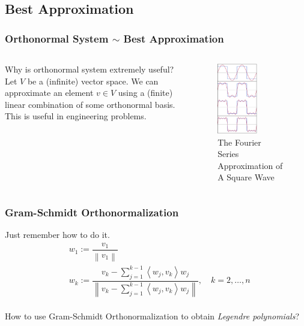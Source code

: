 \documentclass[12pt, t]{beamer}
\newcommand{\nullspace}{~\\[15pt]}
\begin{document}
\subsection{Best Approximation}
\begin{frame}
    \frametitle{Orthonormal System $\sim$ Best Approximation}
    \begin{columns}
        Why is orthonormal system extremely useful?
        \nullspace
        Let $V$ be a (infinite) vector space. We can approximate an element $v\in V$ using a (finite) linear combination of some orthonormal basis. This is useful in engineering problems.
        \begin{figure}[H]
            \centering
            \includegraphics[width=0.6\textwidth]{2020-05-04-01-36-07.png}
            \caption{\small The Fourier Series Approximation of A Square Wave}
        \end{figure}
    \end{columns}
\end{frame}

\begin{frame}
    \frametitle{Gram-Schmidt Orthonormalization}
    Just remember how to do it.
    \begin{align*}
         & w_{1}:=\dfrac{v_{1}}{\left\|v_{1}\right\|}                                                                                                                                                 \\
         & w_{k}:=\dfrac{v_{k}-\sum_{j=1}^{k-1}\left\langle w_{j}, v_{k}\right\rangle w_{j}}{\left\|v_{k}-\sum_{j=1}^{k-1}\left\langle w_{j}, v_{k}\right\rangle w_{j}\right\|}, \quad k=2, \ldots, n
    \end{align*}
    \nullspace
    How to use Gram-Schmidt Orthonormalization to obtain \textit{Legendre polynomials}?
\end{frame}
\end{document}
